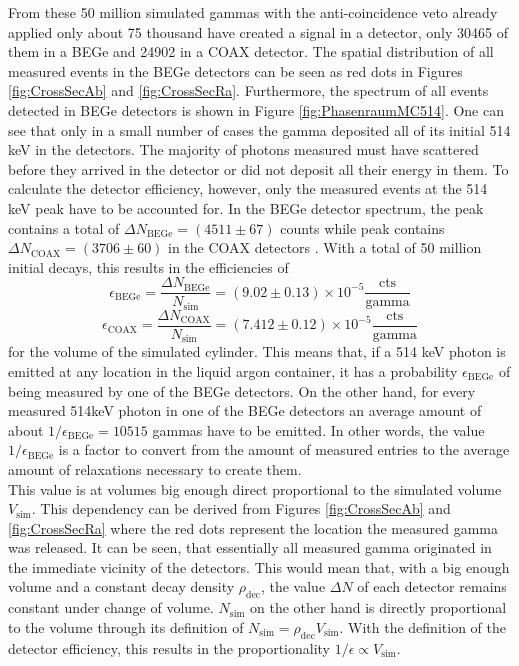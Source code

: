\documentclass[encoding=utf8,british]{tumphthesis}
\begin{document}
From these 50 million simulated gammas with the anti-coincidence veto already applied only about 75 thousand have created a signal in a detector, only 30465 of them in a BEGe and 24902 in a COAX detector.
The spatial distribution of all measured events in the BEGe detectors can be seen as red dots in Figures \ref{fig:CrossSecAb} and \ref{fig:CrossSecRa}.
Furthermore, the spectrum of all events detected in BEGe detectors is shown in Figure \ref{fig:PhasenraumMC514}.
One can see that only in a small number of cases the gamma deposited all of its initial 514 keV in the detectors.
The majority of photons measured must have scattered before they arrived in the detector or did not deposit all their energy in them.
To calculate the detector efficiency, however, only the measured events at the 514 keV peak have to be accounted for.
In the BEGe detector spectrum, the peak contains a total of \(\Delta N_{\mathrm{BEGe}} = (4511\pm67) \) counts while peak contains \(\Delta N_{\mathrm{COAX}} = (3706\pm60) \) in the COAX detectors .
With a total of 50 million initial decays, this results in the efficiencies of 
\begin{equation*}
\epsilon_{\mathrm{BEGe}} = \frac{\Delta N_{\mathrm{BEGe}}}{N_{\mathrm{sim}}} = (9.02\pm0.13) \times 10^{-5}  \frac{\mathrm{cts}}{\mathrm{gamma}}
\end{equation*}
\begin{equation*}
\epsilon_{\mathrm{COAX}} = \frac{\Delta N_{\mathrm{COAX}}}{N_{\mathrm{sim}}} = (7.412\pm0.12) \times 10^{-5}  \frac{\mathrm{cts}}{\mathrm{gamma}}
\end{equation*}
for the volume of the simulated cylinder.
This means that, if a 514 keV photon is emitted at any location in the liquid argon container, it has a probability \(\epsilon_{\mathrm{BEGe}}\) of being measured by one of the BEGe detectors.
On the other hand, for every measured 514keV photon in one of the BEGe detectors an average amount of about $1 / \epsilon_{\mathrm{BEGe}} = 10515$ gammas have to be emitted.
In other words, the value $1 / \epsilon_{\mathrm{BEGe}}$ is a factor to convert from the amount of measured entries to the average amount of  relaxations necessary to create them.
\\

This value is at volumes big enough direct proportional to the simulated volume $V_{\mathrm{sim}}$.
This dependency can be derived from Figures \ref{fig:CrossSecAb} and \ref{fig:CrossSecRa} where the red dots represent the location the measured gamma was released.
It can be seen, that essentially all measured gamma originated in the immediate vicinity of the detectors.
This would mean that, with a big enough volume and a constant decay density $\rho_{\mathrm{dec}}$, the value $\Delta N$ of each detector remains constant under change of volume.
$N_{\mathrm{sim}}$ on the other hand is directly proportional to the volume through its definition of $N_{\mathrm{sim}} = \rho_{\mathrm{dec}} V_{\mathrm{sim}}$.
With the definition of the detector efficiency, this results in the proportionality  $1 / \epsilon \propto V_{\mathrm{sim}}$.
\\
\end{document}

